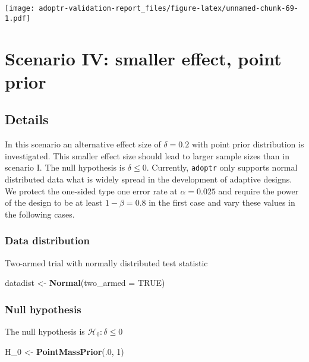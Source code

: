 \documentclass[]{book}
\newenvironment{Shaded}{\begin{snugshade}}{\end{snugshade}}
\newcommand{\DataTypeTok}[1]{\textcolor[rgb]{0.13,0.29,0.53}{#1}}
\newcommand{\DecValTok}[1]{\textcolor[rgb]{0.00,0.00,0.81}{#1}}
\newcommand{\KeywordTok}[1]{\textcolor[rgb]{0.13,0.29,0.53}{\textbf{#1}}}
\newcommand{\NormalTok}[1]{#1}
\newcommand{\OtherTok}[1]{\textcolor[rgb]{0.56,0.35,0.01}{#1}}
\newcommand{\StringTok}[1]{\textcolor[rgb]{0.31,0.60,0.02}{#1}}
\begin{document}
\texttt{[image: adoptr-validation-report\_files/figure-latex/unnamed-chunk-69-1.pdf]}

\hypertarget{scenarioIV}{%
\chapter{Scenario IV: smaller effect, point prior}\label{scenarioIV}}

\hypertarget{details-3}{%
\section{Details}\label{details-3}}

In this scenario an alternative effect size of \(\delta = 0.2\) with
point prior distribution is investigated.
This smaller effect size should lead to larger sample sizes than
in scenario I.
The null hypothesis is \(\delta \leq 0\).
Currently, \texttt{adoptr} only supports normal distributed data what is widely spread
in the development of adaptive designs.
We protect the one-sided type one error rate at \(\alpha = 0.025\) and require
the power of the design to be at least \(1 - \beta = 0.8\) in the first
case and vary these values in the following cases.

\hypertarget{data-distribution-3}{%
\subsection{Data distribution}\label{data-distribution-3}}

Two-armed trial with normally distributed test statistic

\begin{Shaded}
\begin{Highlighting}[]
\NormalTok{datadist <-}\StringTok{ }\KeywordTok{Normal}\NormalTok{(}\DataTypeTok{two_armed =} \OtherTok{TRUE}\NormalTok{)}
\end{Highlighting}
\end{Shaded}

\hypertarget{null-hypothesis-3}{%
\subsection{Null hypothesis}\label{null-hypothesis-3}}

The null hypothesis is \(\mathcal{H}_0:\delta \leq 0\)

\begin{Shaded}
\begin{Highlighting}[]
\NormalTok{H_}\DecValTok{0}\NormalTok{ <-}\StringTok{ }\KeywordTok{PointMassPrior}\NormalTok{(.}\DecValTok{0}\NormalTok{, }\DecValTok{1}\NormalTok{)}
\end{Highlighting}
\end{Shaded}
\end{document}
